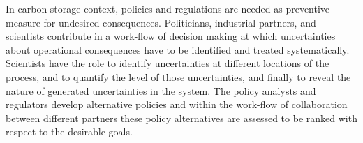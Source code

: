 


In carbon storage context, policies and regulations are needed as preventive measure for undesired consequences. Politicians, industrial partners, and scientists contribute in a work-flow of decision making at which uncertainties about operational consequences have to be identified and treated systematically. Scientists have the role to identify uncertainties at different locations of the process, and to quantify the level of those uncertainties, and finally to reveal the nature of generated uncertainties in the system. The policy analysts and regulators develop alternative policies and within the work-flow of collaboration between different partners these policy alternatives are assessed to be ranked with respect to the desirable goals.

